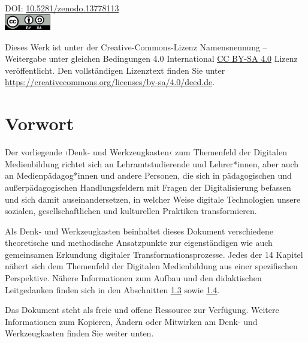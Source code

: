 \documentclass[
  a4paper,
]{book}
\begin{document}
\noindent DOI: \href{https://zenodo.org/records/13778113}{10.5281/zenodo.13778113}\\ %

\includegraphics[width=0.15\textwidth]{"Figures/by-sa.png"}\par\vspace{1cm}


\noindent Dieses Werk ist unter der Creative-Commons-Lizenz Namensnennung – Weitergabe unter gleichen Bedingungen 4.0 International \href{https://creativecommons.org/licenses/by-sa/4.0/}{CC BY-SA 4.0} Lizenz veröffentlicht. Den vollständigen Lizenztext finden Sie unter \href{https://creativecommons.org/licenses/by-sa/4.0/deed.de}{https://creativecommons.org/licenses/by-sa/4.0/deed.de}.\\ %


\newpage
{}

{
\setcounter{tocdepth}{1}
\tableofcontents
}
\chapter*{Vorwort}\label{vorwort}

Der vorliegende ›Denk- und Werkzeugkasten‹ zum Themenfeld der Digitalen Medienbildung richtet sich an Lehramtstudierende und Lehrer*innen, aber auch an Medienpädagog*innen und andere Personen, die sich in pädagogischen und außerpädagogischen Handlungsfeldern mit Fragen der Digitalisierung befassen und sich damit auseinandersetzen, in welcher Weise digitale Technologien unsere sozialen, gesellschaftlichen und kulturellen Praktiken transformieren.

Als Denk- und Werkzeugkasten beinhaltet dieses Dokument verschiedene theoretische und methodische Ansatzpunkte zur eigenständigen wie auch gemeinsamen Erkundung digitaler Transformationsprozesse. Jedes der 14 Kapitel nähert sich dem Themenfeld der Digitalen Medienbildung aus einer spezifischen Perspektive. Nähere Informationen zum Aufbau und den didaktischen Leitgedanken finden sich in den Abschnitten \hyperref[keine-gebrauchsanweisung]{1.3} sowie \hyperref[inhalte-der-materialsammlung]{1.4}.

Das Dokument steht als freie und offene Ressource zur Verfügung. Weitere Informationen zum Kopieren, Ändern oder Mitwirken am Denk- und Werkzeugkasten finden Sie weiter unten.
\end{document}
